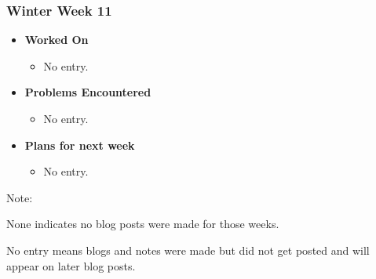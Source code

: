 \documentclass{article}
\begin{document}
\subsubsection{Winter Week 11}
\begin{itemize}
    \item {\textbf{Worked On}}
    \begin{itemize}
      \item No entry.
    \end{itemize}

    \item {\textbf{Problems Encountered}}
    \begin{itemize}
      \item No entry.
    \end{itemize}

    \item{\textbf{Plans for next week}}
    \begin{itemize}
      \item No entry.
    \end{itemize}

\end{itemize}

Note:\par
None indicates no blog posts were made for those weeks.\par
No entry means blogs and notes were made but did not get posted and will
appear on later blog posts.
\end{document}

